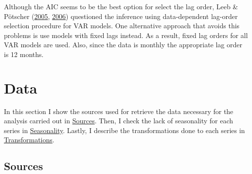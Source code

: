 \documentclass[12pt,twoside]{reedthesis}
\begin{document}
Although the AIC seems to be the best option for select the lag order, Leeb \& Pötscher (\protect\hyperlink{ref-leebpots:2005}{2005}, \protect\hyperlink{ref-leebpots:2006}{2006}) questioned the inference using data-dependent lag-order selection procedure for VAR models. One alternative approach that avoids this problems is use models with fixed lags instead. As a result, fixed lag orders for all VAR models are used. Also, since the data is monthly the appropriate lag order is 12 months.

\hypertarget{data}{%
\chapter{Data}\label{data}}

In this section I show the sources used for retrieve the data necessary for the analysis carried out in \protect\hyperlink{sources}{Sources}. Then, I check the lack of seasonality for each series in \protect\hyperlink{seasonality}{Seasonality}. Lastly, I describe the transformations done to each series in \protect\hyperlink{transformations}{Transformations}.

\hypertarget{sources}{%
\section{Sources}\label{sources}}
\end{document}
